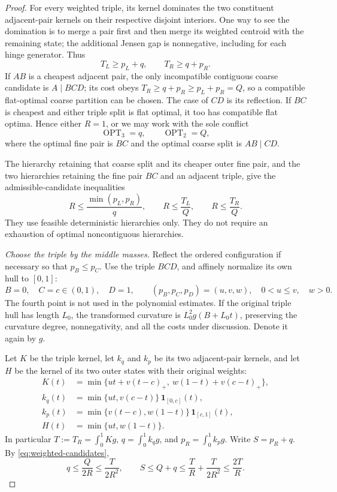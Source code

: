 \begin{proof}
For every weighted triple, its kernel dominates the two constituent
adjacent-pair kernels on their respective disjoint interiors. One way to
see the domination is to merge a pair first and then merge its weighted
centroid with the remaining state; the additional Jensen gap is
nonnegative, including for each hinge generator. Thus
\[
 T_L\ge p_L+q,\qquad T_R\ge q+p_R.
\]
If $AB$ is a cheapest adjacent pair, the only incompatible contiguous
coarse candidate is $A\mid BCD$; its cost obeys
$T_R\ge q+p_R\ge p_L+p_R=Q$, so a compatible flat-optimal coarse
partition can be chosen. The case of $CD$ is its reflection. If $BC$ is
cheapest and either triple split is flat optimal, it too has compatible
flat optima. Hence either $R=1$, or we may work with the sole conflict
\[
 \operatorname{OPT}_3=q,\qquad \operatorname{OPT}_2=Q,
\]
where the optimal fine pair is $BC$ and the optimal coarse split is
$AB\mid CD$.

The hierarchy retaining that coarse split and its cheaper outer fine pair,
and the two hierarchies retaining the fine pair $BC$ and an adjacent triple,
give the admissible-candidate inequalities
\begin{equation}
 R\le\frac{\min(p_L,p_R)}q,\qquad
 R\le\frac{T_L}Q,\qquad R\le\frac{T_R}Q.
 \label{eq:weighted-candidates}
\end{equation}
They use feasible deterministic hierarchies only. They do not require an
exhaustion of optimal noncontiguous hierarchies.

\emph{Choose the triple by the middle masses.}
Reflect the ordered configuration if necessary so that $p_B\le p_C$.
Use the triple $BCD$, and affinely normalize its own hull to $[0,1]$:
\[
 B=0,\quad C=c\in(0,1),\quad D=1,\qquad
 (p_B,p_C,p_D)=(u,v,w),\quad 0<u\le v,\quad w>0.
\]
The fourth point is not used in the polynomial estimates. If the original
triple hull has length $L_0$, the transformed curvature is
$L_0^2g(B+L_0t)$, preserving the curvature degree, nonnegativity, and all
the costs under discussion. Denote it again by $g$.

Let $K$ be the triple kernel, let $k_q$ and $k_p$ be its two adjacent-pair
kernels, and let $H$ be the kernel of its two outer states with their
original weights:
\begin{align*}
 K(t)&=\min\{ut+v(t-c)_+,\ w(1-t)+v(c-t)_+\},\\
 k_q(t)&=\min\{ut,v(c-t)\}\,\mathbf1_{[0,c]}(t),\\
 k_p(t)&=\min\{v(t-c),w(1-t)\}\,\mathbf1_{[c,1]}(t),\\
 H(t)&=\min\{ut,w(1-t)\}.
\end{align*}
In particular $T:=T_R=\int_0^1Kg$, $q=\int_0^1k_qg$, and
$p_R=\int_0^1k_pg$. Write $S=p_R+q$.
By \eqref{eq:weighted-candidates},
\begin{equation}
 q\le\frac{Q}{2R}\le\frac{T}{2R^2},\qquad
 S\le Q+q\le\frac{T}{R}+\frac{T}{2R^2}\le\frac{2T}{R}.
 \label{eq:weighted-two-small-costs}
\end{equation}


\end{proof}
